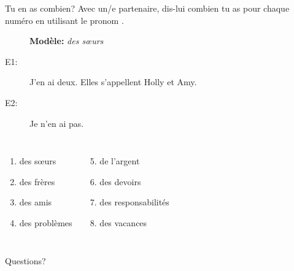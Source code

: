 \documentclass{beamer}
\begin{document}
  \begin{frame}{Tu en as combien?}
    Avec un/e partenaire, dis-lui combien tu as pour chaque numéro en utilisant le pronom . \\
    \begin{description}
      \item[] \textbf{Modèle:} \emph{des sœurs}
      \item[E1:] J'en ai deux. Elles s'appellent Holly et Amy.
      \item[E2:] Je n'en ai pas.
    \end{description}
    \begin{columns}
        \begin{enumerate}
          \item des sœurs
          \item des frères
          \item des amis
          \item des problèmes
        \end{enumerate}
        \begin{enumerate}
          \setcounter{enumi}{4}
          \item de l'argent
          \item des devoirs
          \item des responsabilités
          \item des vacances
        \end{enumerate}
    \end{columns}
  \end{frame}

  \begin{frame}{}
    \begin{center}
      \Large Questions?
    \end{center}
  \end{frame}
\end{document}
